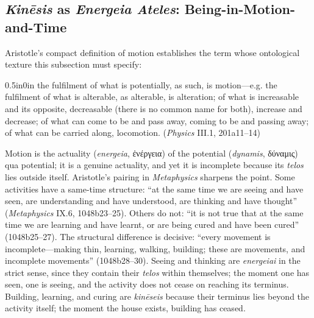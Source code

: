 \documentclass{article}
\newcommand{\gk}[1]{{\greekfont #1}}
\begin{document}
\subsection{\textit{Kinēsis} as \textit{Energeia Ateles}: Being-in-Motion-and-Time}

Aristotle's compact definition of motion establishes the term whose ontological texture this subsection must specify:
\begin{adjustwidth}{0.5in}{0in}
the fulfilment of what is potentially, as such, is motion---e.g. the fulfilment of what is alterable, as alterable, is alteration; of what is increasable and its opposite, decreasable (there is no common name for both), increase and decrease; of what can come to be and pass away, coming to be and passing away; of what can be carried along, locomotion. (\textit{Physics} III.1, 201a11--14)
\end{adjustwidth}
Motion is the actuality (\textit{energeia}, \gk{ἐνέργεια}) of the potential (\textit{dynamis}, \gk{δύναμις}) qua potential; it is a genuine actuality, and yet it is incomplete because its \textit{telos} lies outside itself. Aristotle's pairing in \textit{Metaphysics} sharpens the point. Some activities have a same-time structure: ``at the same time we are seeing and have seen, are understanding and have understood, are thinking and have thought'' (\textit{Metaphysics} IX.6, 1048b23--25). Others do not: ``it is not true that at the same time we are learning and have learnt, or are being cured and have been cured'' (1048b25--27). The structural difference is decisive: ``every movement is incomplete---making thin, learning, walking, building; these are movements, and incomplete movements'' (1048b28--30). Seeing and thinking are \textit{energeiai} in the strict sense, since they contain their \textit{telos} within themselves; the moment one has seen, one is seeing, and the activity does not cease on reaching its terminus. Building, learning, and curing are \textit{kinēseis} because their terminus lies beyond the activity itself; the moment the house exists, building has ceased.
\end{document}
